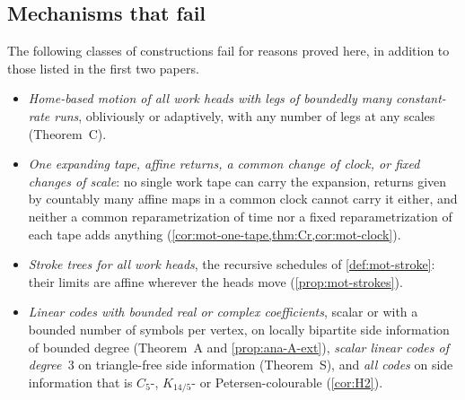 \subsection{Mechanisms that fail}\label{sec:con-fail}

The following classes of constructions fail for reasons proved here, in addition to those listed in the first two papers.
\begin{itemize}[leftmargin=2em]
\item \emph{Home-based motion of all work heads with legs of boundedly many constant-rate runs}, obliviously or
adaptively, with any number of legs at any scales (Theorem~C).
\item \emph{One expanding tape, affine returns, a common change of clock, or fixed changes of scale}: no single work tape
can carry the expansion, returns given by countably many affine maps in a common clock cannot carry it either, and
neither a common reparametrization of time nor a fixed reparametrization of each tape adds anything
(\cref{cor:mot-one-tape,thm:Cr,cor:mot-clock}).
\item \emph{Stroke trees for all work heads}, the recursive schedules of \cref{def:mot-stroke}: their limits are affine
wherever the heads move (\cref{prop:mot-strokes}).
\item \emph{Linear codes with bounded real or complex coefficients}, scalar or with a bounded number of symbols per
vertex, on locally bipartite side information of bounded degree (Theorem~A and \cref{prop:ana-A-ext}),
\emph{scalar linear codes of degree~$3$} on triangle-free side information (Theorem~S), and \emph{all codes} on
side information that is $C_5$-, $K_{14/5}$- or Petersen-colourable (\cref{cor:H2}).
\end{itemize}
